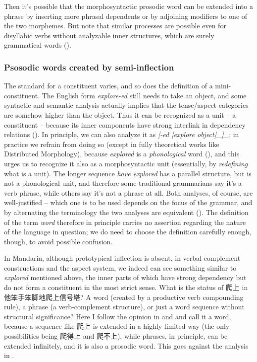 \documentclass[UTF8, a4paper, oneside, scheme=plain]{ctexrep}
\newcommand*{\citesec}[1]{\S~{#1}}
\newcommand*{\citepage}[1]{p.~{#1}}
\newcommand*{\term}[1]{\emph{#1}}
\newcommand{\corpus}[1]{\emph{#1}}
\begin{document}
Then it's possible that the morphosyntactic prosodic word can be extended into a phrase 
by inserting more phrasal dependents 
or by adjoining modifiers to one of the two morphemes.
But note that similar processes are possible even for 
disyllabic verbs without analyzable inner structures,
which are surely grammatical words ().

\subsubsection{Psosodic words created by semi-inflection}\label{sec:pos.architecture.word-confusing.constituent}

The standard for a constituent varies,
and so does the definition of a mini-constituent.
The English form \corpus{explore-ed} 
still needs to take an object, 
and some syntactic and semantic analysis 
actually implies that the tense/aspect categories are somehow higher than the object.
Thus it can be recognized as a unit -- a constituent -- because 
its inner components have strong interlink in dependency relations
().
In principle, we can also analyze it as 
\corpus{[-ed [explore \emph{object}]_{}]_{\text{\acs{tame} marking}}};
in practice we refrain from doing so
(except in fully theoretical works like Distributed Morphology), 
because \corpus{explored} is a \emph{phonological} word 
(),
and this urges us to recognize it also as a morphosyntactic unit
(essentially, by \emph{redefining} what is a unit).
The longer sequence \corpus{have explored} 
has a parallel structure, 
but is not a phonological unit, 
and therefore some traditional grammarians say it's a verb phrase,
while others say it's not a phrase at all. 
Both analyses, of course, are well-justified -- 
which one is to be used 
depends on the focus of the grammar,
and by alternating the terminology 
the two analyses are equivalent
().
The definition of the term \term{word} 
therefore in principle carries no assertion regarding 
the nature of the language in question; 
we do need to choose the definition carefully enough, though, 
to avoid possible confusion.

In Mandarin, although prototypical inflection is absent, 
in verbal complement constructions 
and the aspect system, 
we indeed can see something similar to \corpus{explored} mentioned above, 
the inner parts of which have strong dependency
but do not form a constituent in the most strict sense.
What is the status of 爬上 in 他笨手笨脚地爬上信号塔?
A word (created by a productive verb compounding rule), 
a phrase (a verb-complement structure),
or just a word sequence without structural significance?
Here I follow the opinion in \citep[\citepage{86}]{feng2000} and \citet{tham2015resultative}
and call it a word,
because a sequence like 爬上 is extended in a highly limited way 
(the only possibilities being 爬得上 and 爬不上),
while phrases, in principle, can be extended infinitely, 
and it is also a prosodic word.
This goes against the analysis in \citep[\citesec{1.2.7}]{zhudexigrammar}.
\end{document}
